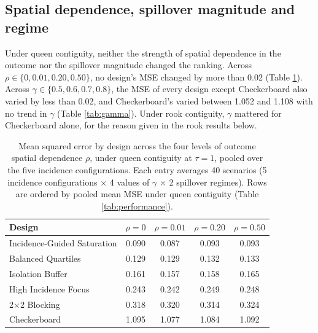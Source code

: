 \documentclass[11pt]{article}
\begin{document}
\subsection{Spatial dependence, spillover magnitude and regime}\label{sensitivity-to-spatial-dependence-spillover-magnitude-and-spillover-regime}

Under queen contiguity, neither the strength of spatial dependence in
the outcome nor the spillover magnitude changed the ranking. Across
\(\rho \in \{0, 0.01, 0.20, 0.50\}\), no design's MSE changed by more
than 0.02 (Table \ref{tab:rho}). Across
\(\gamma \in \{0.5, 0.6, 0.7, 0.8\}\), the MSE of every design except
Checkerboard also varied by less than 0.02, and Checkerboard's varied
between 1.052 and 1.108 with no trend in \(\gamma\) (Table
\ref{tab:gamma}). Under rook contiguity, \(\gamma\) mattered for
Checkerboard alone, for the reason given in the rook results below.

\begin{table}[!htb]

\small
\centering

\caption{Mean squared error by design across the four levels of outcome spatial dependence $\rho$, under queen contiguity at $\tau = 1$, pooled over the five incidence configurations. Each entry averages 40 scenarios (5 incidence configurations $\times$ 4 values of $\gamma$ $\times$ 2 spillover regimes). Rows are ordered by pooled mean MSE under queen contiguity (Table \ref{tab:performance}).}
\label{tab:rho}

\begin{tabular}{lcccc}

\toprule
Design & $\rho=0$ & $\rho=0.01$ & $\rho=0.20$ & $\rho=0.50$ \\

\midrule
Incidence-Guided Saturation & 0.090 & 0.087 & 0.093 & 0.093 \\
Balanced Quartiles & 0.129 & 0.129 & 0.132 & 0.133 \\
Isolation Buffer & 0.161 & 0.157 & 0.158 & 0.165 \\
High Incidence Focus & 0.243 & 0.242 & 0.249 & 0.248 \\
2$\times$2 Blocking & 0.318 & 0.320 & 0.314 & 0.324 \\
Checkerboard & 1.095 & 1.077 & 1.084 & 1.092 \\

\bottomrule

\end{tabular}

\end{table}
\end{document}
